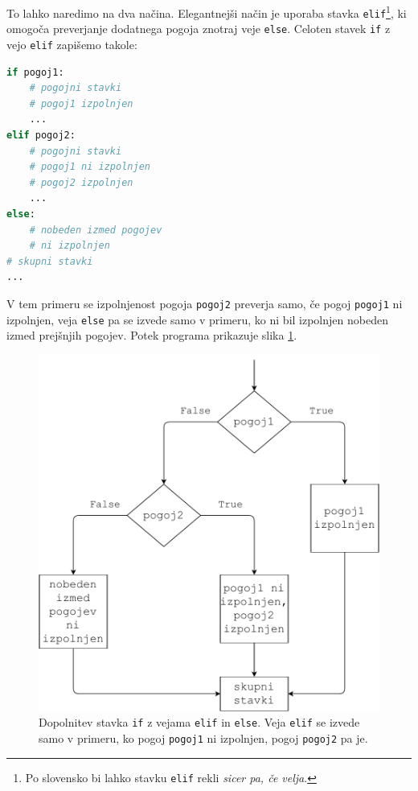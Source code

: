 To lahko naredimo na dva načina. Elegantnejši način je uporaba stavka \texttt{elif}\footnote{Po slovensko bi lahko stavku \texttt{elif} rekli \emph{sicer pa, če velja}.}, ki omogoča preverjanje dodatnega pogoja znotraj veje \texttt{else}. Celoten stavek \texttt{if} z vejo \texttt{elif} zapišemo takole:
\begin{lstlisting}[language=Python]
if pogoj1:
    # pogojni stavki
    # pogoj1 izpolnjen
    ...
elif pogoj2:
    # pogojni stavki
    # pogoj1 ni izpolnjen
    # pogoj2 izpolnjen
    ...
else:
    # nobeden izmed pogojev
    # ni izpolnjen
# skupni stavki
...
\end{lstlisting}
V tem primeru se izpolnjenost pogoja \texttt{pogoj2} preverja samo, če pogoj \texttt{pogoj1} ni izpolnjen, veja \texttt{else} pa se izvede samo v primeru, ko ni bil izpolnjen nobeden izmed prejšnjih pogojev. Potek programa prikazuje slika \ref{img:if3}.

\begin{figure}
    \centering
    \includegraphics[width=0.65\linewidth]{img/if3.pdf}
    \caption{Dopolnitev stavka \texttt{if} z vejama \texttt{elif} in \texttt{else}. Veja \texttt{elif} se izvede samo v primeru, ko pogoj \texttt{pogoj1} ni izpolnjen, pogoj \texttt{pogoj2} pa je.}
    \label{img:if3}
\end{figure}


